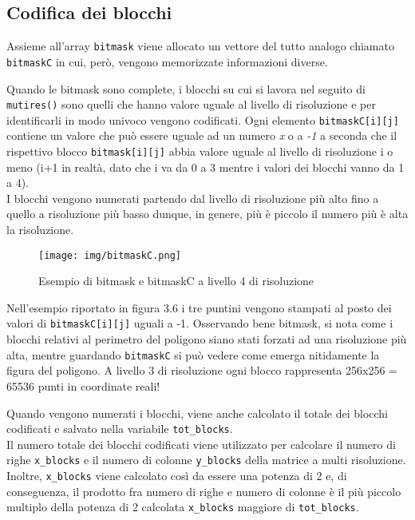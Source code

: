 		\subsection{Codifica dei blocchi} 
			Assieme all'array \texttt{bitmask} viene allocato un vettore del tutto analogo chiamato \texttt{bitmaskC} in cui, per\`{o}, vengono memorizzate informazioni diverse.

			Quando le bitmask sono complete, i blocchi su cui si lavora nel seguito di \texttt{mutires()} sono quelli che hanno valore uguale al livello di risoluzione e per identificarli in modo univoco vengono codificati. Ogni elemento \texttt{bitmaskC[i][j]} contiene un valore che pu\`{o} essere uguale ad un numero \textit{x} o a \textit{-1} a seconda che il rispettivo blocco \texttt{bitmask[i][j]} abbia valore uguale al livello di risoluzione i o meno (i+1 in realt\`{a}, dato che i va da 0 a 3 mentre i valori dei blocchi vanno da 1 a 4). \\
			I blocchi vengono numerati partendo dal livello di risoluzione pi\`{u} alto fino a quello a risoluzione pi\`{u} basso dunque, in genere, pi\`{u} \`{e} piccolo il numero pi\`{u} \`{e} alta la risoluzione.
			\begin{figure}[htbp]
				\centering
				\texttt{[image: img/bitmaskC.png]}
				\caption{Esempio di bitmask e bitmaskC a livello 4 di risoluzione}
			\end{figure}
			Nell'esempio riportato in figura 3.6 i tre puntini vengono stampati al posto dei valori di \texttt{bitmaskC[i][j]} uguali a -1. Osservando bene bitmask, si nota come i blocchi relativi al perimetro del poligono siano stati forzati ad una risoluzione pi\`{u} alta, mentre guardando \texttt{bitmaskC} si pu\`{o} vedere come emerga nitidamente la figura del poligono. A livello 3 di risoluzione ogni blocco rappresenta 256x256 = 65536 punti in coordinate reali!

			Quando vengono numerati i blocchi, viene anche calcolato il totale dei blocchi codificati e salvato nella variabile \texttt{tot\_blocks}. \\
			Il numero totale dei blocchi codificati viene utilizzato per calcolare il numero di righe \texttt{x\_blocks} e il numero di colonne \texttt{y\_blocks} della matrice a multi risoluzione. Inoltre, \texttt{x\_blocks} viene calcolato cos\`{i} da essere una potenza di 2 e, di conseguenza, il prodotto fra numero di righe e numero di colonne \`{e} il pi\`{u} piccolo multiplo della potenza di 2 calcolata \texttt{x\_blocks} maggiore di \texttt{tot\_blocks}. 

